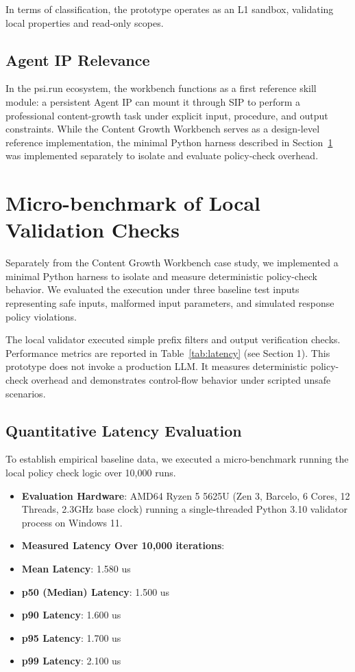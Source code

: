 \documentclass[10pt,journal,compsoc]{IEEEtran}
\begin{document}
In terms of classification, the prototype operates as an L1 sandbox, validating local properties and read-only scopes.

\subsection{Agent IP Relevance}
In the psi.run ecosystem, the workbench functions as a first reference skill module: a persistent Agent IP can mount it through SIP to perform a professional content-growth task under explicit input, procedure, and output constraints. While the Content Growth Workbench serves as a design-level reference implementation, the minimal Python harness described in Section~\ref{sec:benchmark} was implemented separately to isolate and evaluate policy-check overhead.


\section{Micro-benchmark of Local Validation Checks}
\label{sec:benchmark}
Separately from the Content Growth Workbench case study, we implemented a minimal Python harness to isolate and measure deterministic policy-check behavior. We evaluated the execution under three baseline test inputs representing safe inputs, malformed input parameters, and simulated response policy violations.

The local validator executed simple prefix filters and output verification checks. Performance metrics are reported in Table~\ref{tab:latency} (see Section 1). This prototype does not invoke a production LLM. It measures deterministic policy-check overhead and demonstrates control-flow behavior under scripted unsafe scenarios.

\subsection{Quantitative Latency Evaluation}
To establish empirical baseline data, we executed a micro-benchmark running the local policy check logic over 10,000 runs.
\begin{itemize}
  \item \textbf{Evaluation Hardware}: AMD64 Ryzen 5 5625U (Zen 3, Barcelo, 6 Cores, 12 Threads, 2.3GHz base clock) running a single-threaded Python 3.10 validator process on Windows 11.
  \item \textbf{Measured Latency Over 10,000 iterations}:
  \item \textbf{Mean Latency}: 1.580 us
  \item \textbf{p50 (Median) Latency}: 1.500 us
  \item \textbf{p90 Latency}: 1.600 us
  \item \textbf{p95 Latency}: 1.700 us
  \item \textbf{p99 Latency}: 2.100 us
\end{itemize}
\end{document}
